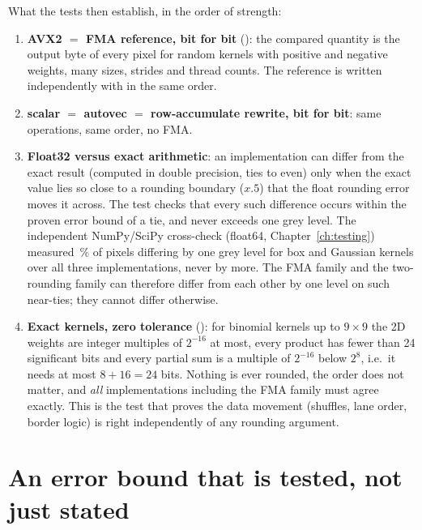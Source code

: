 What the tests then establish, in the order of strength:
\begin{enumerate}
\item \textbf{AVX2 $=$ FMA reference, bit for bit} (): the compared quantity is the output byte of every pixel for random kernels with positive and negative weights, many sizes, strides and thread counts. The reference is written independently with  in the same order.
\item \textbf{scalar $=$ autovec $=$ row-accumulate rewrite, bit for bit}: same operations, same order, no FMA.
\item \textbf{Float32 versus exact arithmetic}: an implementation can differ from the exact result (computed in double precision, ties to even) only when the exact value lies so close to a rounding boundary ($x.5$) that the float rounding error moves it across. The test  checks that every such difference occurs within the proven error bound of a tie, and never exceeds one grey level. The independent NumPy/SciPy cross-check (float64, Chapter~\ref{ch:testing}) measured \crossApproxPct\,\% of pixels differing by one grey level for box and Gaussian kernels over all three implementations, never by more. The FMA family and the two-rounding family can therefore differ from each other by one level on such near-ties; they cannot differ otherwise.
\item \textbf{Exact kernels, zero tolerance} (): for binomial kernels up to $9\times9$ the 2D weights are integer multiples of $2^{-16}$ at most, every product has fewer than 24 significant bits and every partial sum is a multiple of $2^{-16}$ below $2^{8}$, i.e.\ it needs at most $8+16=24$ bits. Nothing is ever rounded, the order does not matter, and \emph{all} implementations including the FMA family must agree exactly. This is the test that proves the data movement (shuffles, lane order, border logic) is right independently of any rounding argument.
\end{enumerate}

\section{An error bound that is tested, not just stated}

